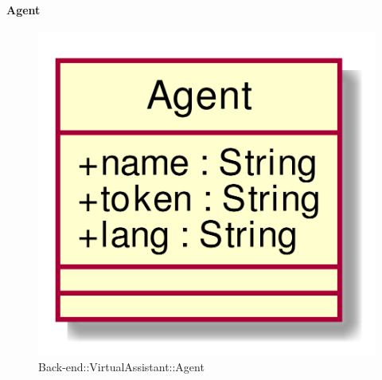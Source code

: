 \hypertarget{Agent_label}{\paragraph{Agent}}
\begin{figure}[h]
	\centering
	\includegraphics[width=\textwidth,height=\textheight,keepaspectratio]{images/ClassAgent.png}
	\caption{Back-end::VirtualAssistant::Agent}
\end{figure}
